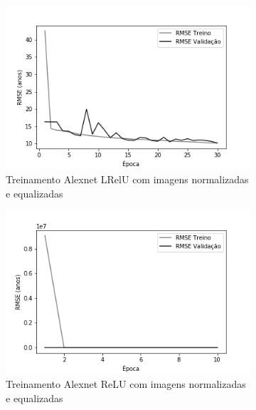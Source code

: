 \begin{figure}[hb!]
	\caption{Redes neurais biológicas.}
	\begin{subfigure}[hb]{0.5\linewidth}
		\caption{Treinamento Alexnet LRelU com imagens normalizadas e equalizadas}
		\label{fig:histalexlrelunorm}
    \centering
		\includegraphics[width=\linewidth]{img/graficos-fase2/fig-history-alexnet-lrelu-data-augmentation-2-2.png}
	\end{subfigure}
	\begin{subfigure}[hb]{0.5\linewidth}
		\caption{Treinamento Alexnet ReLU com imagens normalizadas e equalizadas}
		\label{fig:redeneuralbiologica}
		\includegraphics[width=\linewidth]{img/graficos-fase2/fig-history-alexnet-relu-data-augmentation-2-1.png}
	\end{subfigure}\\
  \begin{subfigure}[hb]{0.5\linewidth}

\end{subfigure}
\end{figure}
